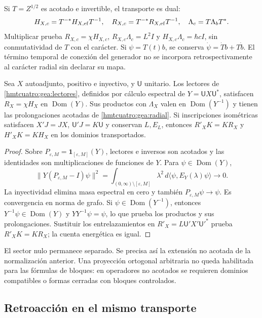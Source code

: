 Si $T=Z^{1/2}$ es acotado e invertible, el transporte es dual:
\begin{equation}
H_{X,c}=T^{-*}H_{X,\rm ef}T^{-1},\quad
R_{X,c}=T^{-*}R_{X,\rm ef}T^{-1},\quad
\Lambda_c=T\Lambda_bT^*.
\label{hmtcuatro:gea:dual}
\end{equation}
Multiplicar prueba $R_{X,c}=\chi H_{X,c}$,
$R_{X,c}\Lambda_c=L^2I$ y $H_{X,c}\Lambda_c=\hbar cI$,
sin conmutatividad de $T$ con el carácter.
Si $\psi=T(t)b$, se conserva $\dot\psi=\dot Tb+T\dot b$.
El término temporal de conexión del generador no se incorpora
retrospectivamente al carácter radial sin declarar su mapa.

\begin{proposition}
\label{hmtcuatro:gea:limite}
Sea $X$ autoadjunto, positivo e inyectivo, y $\mathsf U$ unitario.
Los lectores de \eqref{hmtcuatro:gea:lectores}, definidos por cálculo
espectral de $Y=\mathsf UX\mathsf U^*$, satisfacen
$R_X=\chi H_X$ en $\operatorname{Dom}(Y)$.
Sus productos con $\Lambda_X$ valen en $\operatorname{Dom}(Y^{-1})$
y tienen las prolongaciones acotadas de \eqref{hmtcuatro:gea:radial}.
Si inscripciones isométricas satisfacen $X'J=JX$,
$\mathsf U'J=K\mathsf U$ y conservan $L,E_L$, entonces
$R'_XK=KR_X$ y $H'_XK=KH_X$ en los dominios transportados.
\end{proposition}
\begin{proof}
Sobre $P_{\varepsilon,M}=\mathbf1_{[\varepsilon,M]}(Y)$, lectores e
inversos son acotados y las identidades son multiplicaciones de
funciones de $Y$. Para $\psi\in\operatorname{Dom}(Y)$,
\[
\|Y(P_{\varepsilon,M}-I)\psi\|^2
=\int_{(0,\infty)\setminus[\varepsilon,M]}
\lambda^2\,d\langle\psi,E_Y(\lambda)\psi\rangle\longrightarrow0.
\]
La inyectividad elimina masa espectral en cero y también
$P_{\varepsilon,M}\psi\to\psi$. Es convergencia en norma de grafo.
Si $\psi\in\operatorname{Dom}(Y^{-1})$, entonces
$Y^{-1}\psi\in\operatorname{Dom}(Y)$ y $YY^{-1}\psi=\psi$,
lo que prueba los productos y sus prolongaciones.
Sustituir los entrelazamientos en $R'_X=L\mathsf U'X'\mathsf U'^*$
prueba $R'_XK=KR_X$; la cuenta energética es igual.
\end{proof}
El sector nulo permanece separado. Se precisa así la extensión no
acotada de la normalización anterior. Una proyección ortogonal
arbitraria no queda habilitada para las fórmulas de bloques:
en operadores no acotados se requieren dominios compatibles o formas
cerradas con bloques controlados.

\subsection{Retroacción en el mismo transporte}
\label{hmtcuatro:gea:retroaccion}

